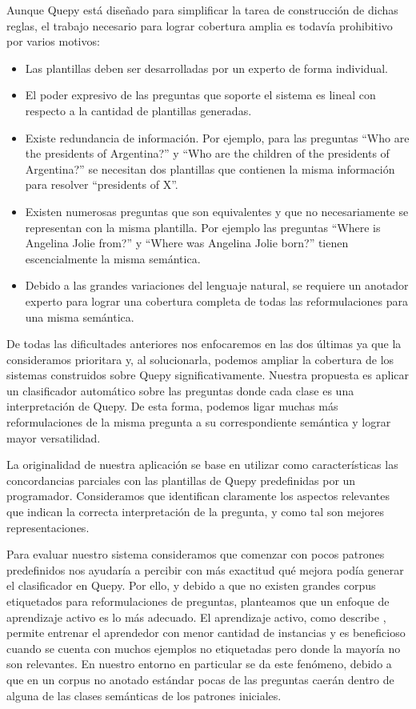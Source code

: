 Aunque Quepy está diseñado para simplificar la tarea de construcción de dichas reglas, el trabajo necesario para lograr cobertura amplia es todavía prohibitivo por varios motivos:
\begin{itemize}
    \item Las plantillas deben ser desarrolladas por un experto de forma individual.
    \item El poder expresivo de las preguntas que soporte el sistema es lineal con respecto a la cantidad de plantillas generadas.
    \item Existe redundancia de información. Por ejemplo, para las preguntas ``Who are the presidents of Argentina?'' y ``Who are the children of the presidents of Argentina?'' se necesitan dos plantillas que contienen la misma información para resolver ``presidents of X''.
    \item Existen numerosas preguntas que son equivalentes y que no necesariamente se representan con la misma plantilla. Por ejemplo las preguntas ``Where is Angelina Jolie from?'' y ``Where was Angelina Jolie born?'' tienen escencialmente la misma semántica.
    \item Debido a las grandes variaciones del lenguaje natural, se requiere un anotador experto para lograr una cobertura completa de todas las reformulaciones para una misma semántica.
\end{itemize}

De todas las dificultades anteriores nos enfocaremos en las dos últimas ya que la consideramos prioritara y, al solucionarla, podemos ampliar la cobertura de los sistemas construidos sobre Quepy significativamente. Nuestra propuesta es aplicar un clasificador automático sobre las preguntas donde cada clase es una interpretación de Quepy. De esta forma, podemos ligar muchas más reformulaciones de la misma pregunta a su correspondiente semántica y lograr mayor versatilidad.

La originalidad de nuestra aplicación se base en utilizar como características las concordancias parciales con las plantillas de Quepy predefinidas por un programador. Consideramos que identifican claramente los aspectos relevantes que indican la correcta interpretación de la pregunta, y como tal son mejores representaciones.

Para evaluar nuestro sistema consideramos que comenzar con pocos patrones predefinidos nos ayudaría a percibir con más exactitud qué mejora podía generar el clasificador en Quepy. Por ello, y debido a que no existen grandes corpus etiquetados para reformulaciones de preguntas, planteamos que un enfoque de aprendizaje activo es lo más adecuado. El aprendizaje activo, como describe \citet{settles_active_learning_survey}, permite entrenar el aprendedor con menor cantidad de instancias y es beneficioso cuando se cuenta con muchos ejemplos no etiquetadas pero donde la mayoría no son relevantes. En nuestro entorno en particular se da este fenómeno, debido a que en un corpus no anotado estándar pocas de las preguntas caerán dentro de alguna de las clases semánticas de los patrones iniciales.

